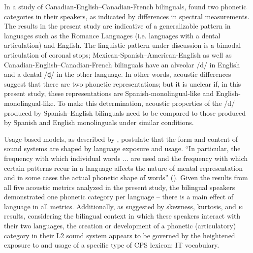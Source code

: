 \documentclass[output=paper,colorlinks,citecolor=brown,
]{langscibook}
\begin{document}
In a study of Canadian-English--Canadian-French bilinguals, \citet{sundara2006production} found two phonetic categories in their speakers, as indicated by differences in spectral measurements. The results in the present study are indicative of a generalizable pattern in languages such as the Romance Languages (i.e. languages with a dental articulation) and English. The linguistic pattern under discussion is a bimodal articulation of coronal stops; Mexican-Spanish--American-English as well as Canadian-English--Canadian-French bilinguals have an alveolar /d/ in English and a dental /d̪/ in the other language. In other words, acoustic differences suggest that there are two phonetic representations; but it is unclear if, in this present study, these representations are Spanish-monolingual-like and English-monolingual-like. To make this determination, acoustic properties of the /d/ produced by Spanish--English bilinguals need to be compared to those produced by Spanish and English monolinguals under similar conditions.

Usage-based models, as described by \citeauthor{bybee2001phonology}, postulate that the form and content of sound systems are shaped by language exposure and usage. ``In particular, the frequency with which individual words ... are used and the frequency with which certain patterns recur in a language affects the nature of mental representation and in some cases the actual phonetic shape of words'' (\citeyear[1]{bybee2001phonology}). Given the results from all five acoustic metrics analyzed in the present study, the bilingual speakers demonstrated one phonetic category per language -- there is a main effect of language in all metrics. Additionally, as suggested by skewness, kurtosis, and \textsc{ri} results, considering the bilingual context in which these speakers interact with their two languages, the creation or development of a phonetic (articulatory) category in their L2 sound system appears to be governed by the heightened exposure to and usage of a specific type of CPS lexicon: IT vocabulary.
\end{document}
